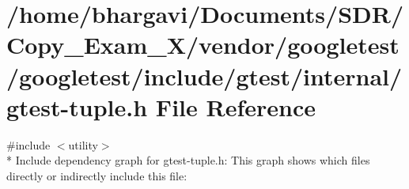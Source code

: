 \hypertarget{gtest-tuple_8h}{}\section{/home/bhargavi/\+Documents/\+S\+D\+R/\+Copy\+\_\+\+Exam\+\_\+X/vendor/googletest/googletest/include/gtest/internal/gtest-\/tuple.h File Reference}
\label{gtest-tuple_8h}
{\ttfamily \#include $<$utility$>$}\\*
Include dependency graph for gtest-\/tuple.h\+:
This graph shows which files directly or indirectly include this file\+:
